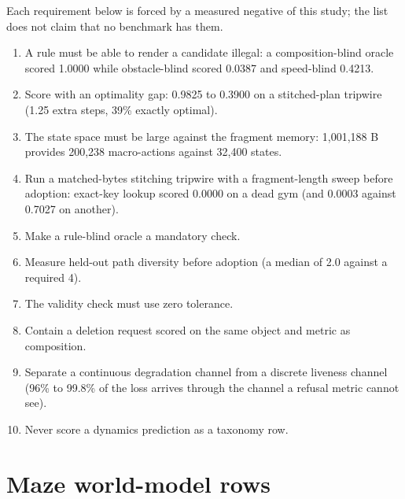 \documentclass{article} %
\begin{document}
Each requirement below is forced by a measured negative of this study; the list does not
claim that no benchmark has them. %
\begin{enumerate}[leftmargin=*,itemsep=1pt]
\item A rule must be able to render a candidate illegal: a composition-blind oracle scored 1.0000
  while obstacle-blind scored 0.0387 and speed-blind 0.4213. %
\item Score with an optimality gap: 0.9825 to 0.3900 on a stitched-plan tripwire (1.25 extra steps,
  39\% exactly optimal). %
\item The state space must be large against the fragment memory: 1,001,188 B provides 200,238
  macro-actions against 32,400 states. %
\item Run a matched-bytes stitching tripwire with a fragment-length sweep before adoption: exact-key
  lookup scored 0.0000 on a dead gym (and 0.0003 against 0.7027 on another).
\item Make a rule-blind oracle a mandatory check.
\item Measure held-out path diversity before adoption (a median of 2.0 against a required 4).
\item The validity check must use zero tolerance.
\item Contain a deletion request scored on the same object and metric as composition.
\item Separate a continuous degradation channel from a discrete liveness channel (96\% to 99.8\% of
  the loss arrives through the channel a refusal metric cannot see). %
\item Never score a dynamics prediction as a taxonomy row.
\end{enumerate}

\section{Maze world-model rows}
\label{app:mazewm}
\end{document}
